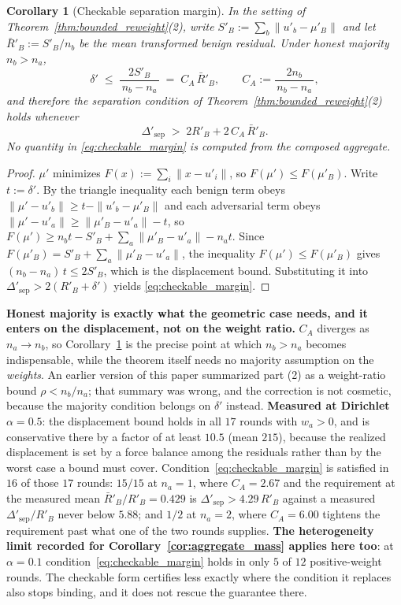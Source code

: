 \documentclass{article}
\newtheorem{corollary}{Corollary}
\begin{document}
\begin{corollary}[Checkable separation margin]
\label{cor:checkable_margin}
In the setting of Theorem~\ref{thm:bounded_reweight}(2), write $S'_B := \sum_b \|u'_b - \mu'_B\|$ and let $\bar R'_B := S'_B/n_b$ be the \emph{mean} transformed benign residual. Under honest majority $n_b > n_a$,
\[
\delta' \;\leq\; \frac{2 S'_B}{\,n_b - n_a\,} \;=\; C_A\,\bar R'_B, \qquad C_A := \frac{2 n_b}{\,n_b - n_a\,},
\]
and therefore the separation condition of Theorem~\ref{thm:bounded_reweight}(2) holds whenever
\begin{equation}
\label{eq:checkable_margin}
\Delta'_{\mathrm{sep}} \;>\; 2 R'_B + 2\,C_A\,\bar R'_B .
\end{equation}
No quantity in \eqref{eq:checkable_margin} is computed from the composed aggregate.
\end{corollary}
\begin{proof}
$\mu'$ minimizes $F(x) := \sum_i \|x - u'_i\|$, so $F(\mu') \leq F(\mu'_B)$. Write $t := \delta'$. By the triangle inequality each benign term obeys $\|\mu' - u'_b\| \geq t - \|u'_b - \mu'_B\|$ and each adversarial term obeys $\|\mu' - u'_a\| \geq \|\mu'_B - u'_a\| - t$, so $F(\mu') \geq n_b t - S'_B + \sum_a \|\mu'_B - u'_a\| - n_a t$. Since $F(\mu'_B) = S'_B + \sum_a \|\mu'_B - u'_a\|$, the inequality $F(\mu') \leq F(\mu'_B)$ gives $(n_b - n_a)\,t \leq 2 S'_B$, which is the displacement bound. Substituting it into $\Delta'_{\mathrm{sep}} > 2(R'_B + \delta')$ yields \eqref{eq:checkable_margin}. \qedhere
\end{proof}

\noindent\textbf{Honest majority is exactly what the geometric case needs, and it enters on the displacement, not on the weight ratio.} $C_A$ diverges as $n_a \to n_b$, so Corollary~\ref{cor:checkable_margin} is the precise point at which $n_b > n_a$ becomes indispensable, while the theorem itself needs no majority assumption on the \emph{weights}. An earlier version of this paper summarized part (2) as a weight-ratio bound $\rho < n_b/n_a$; that summary was wrong, and the correction is not cosmetic, because the majority condition belongs on $\delta'$ instead. \textbf{Measured at Dirichlet $\alpha{=}0.5$}: the displacement bound holds in all $17$ rounds with $w_a>0$, and is conservative there by a factor of at least $10.5$ (mean $215$), because the realized displacement is set by a force balance among the residuals rather than by the worst case a bound must cover. Condition~\eqref{eq:checkable_margin} is satisfied in $16$ of those $17$ rounds: $15/15$ at $n_a{=}1$, where $C_A = 2.67$ and the requirement at the measured mean $\bar R'_B/R'_B = 0.429$ is $\Delta'_{\mathrm{sep}} > 4.29\,R'_B$ against a measured $\Delta'_{\mathrm{sep}}/R'_B$ never below $5.88$; and $1/2$ at $n_a{=}2$, where $C_A = 6.00$ tightens the requirement past what one of the two rounds supplies. \textbf{The heterogeneity limit recorded for Corollary~\ref{cor:aggregate_mass} applies here too}: at $\alpha{=}0.1$ condition~\eqref{eq:checkable_margin} holds in only $5$ of $12$ positive-weight rounds. The checkable form certifies less exactly where the condition it replaces also stops binding, and it does not rescue the guarantee there.
\end{document}
